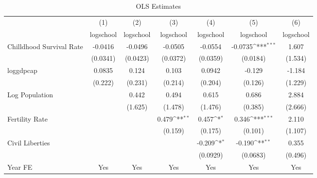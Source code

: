 \begin{table}[htbp]\centering
\def\sym#1{\ifmmode^{#1}\else\(^{#1}\)\fi}
\caption{OLS Estimates}
\begin{tabular}{l*{6}{c}}
\toprule
                &\multicolumn{1}{c}{(1)}&\multicolumn{1}{c}{(2)}&\multicolumn{1}{c}{(3)}&\multicolumn{1}{c}{(4)}&\multicolumn{1}{c}{(5)}&\multicolumn{1}{c}{(6)}\\
                &\multicolumn{1}{c}{logschool}&\multicolumn{1}{c}{logschool}&\multicolumn{1}{c}{logschool}&\multicolumn{1}{c}{logschool}&\multicolumn{1}{c}{logschool}&\multicolumn{1}{c}{logschool}\\
\midrule
Chilldhood Survival Rate&  -0.0416         &  -0.0496         &  -0.0505         &  -0.0554         &  -0.0735\sym{***}&    1.607         \\
                & (0.0341)         & (0.0423)         & (0.0372)         & (0.0359)         & (0.0184)         &  (1.534)         \\
\addlinespace
loggdpcap       &   0.0835         &    0.124         &    0.103         &   0.0942         &   -0.129         &   -1.184         \\
                &  (0.222)         &  (0.231)         &  (0.214)         &  (0.204)         &  (0.126)         &  (1.229)         \\
\addlinespace
Log Population  &                  &    0.442         &    0.494         &    0.615         &    0.686         &    2.884         \\
                &                  &  (1.625)         &  (1.478)         &  (1.476)         &  (0.385)         &  (2.666)         \\
\addlinespace
Fertility Rate  &                  &                  &    0.479\sym{**} &    0.457\sym{*}  &    0.346\sym{***}&    2.110         \\
                &                  &                  &  (0.159)         &  (0.175)         &  (0.101)         &  (1.107)         \\
\addlinespace
Civil Liberties &                  &                  &                  &   -0.209\sym{*}  &   -0.190\sym{**} &    0.355         \\
                &                  &                  &                  & (0.0929)         & (0.0683)         &  (0.496)         \\
\addlinespace
Year FE         &      Yes         &      Yes         &      Yes         &      Yes         &      Yes         &      Yes         \\

\end{tabular}
\end{table}
